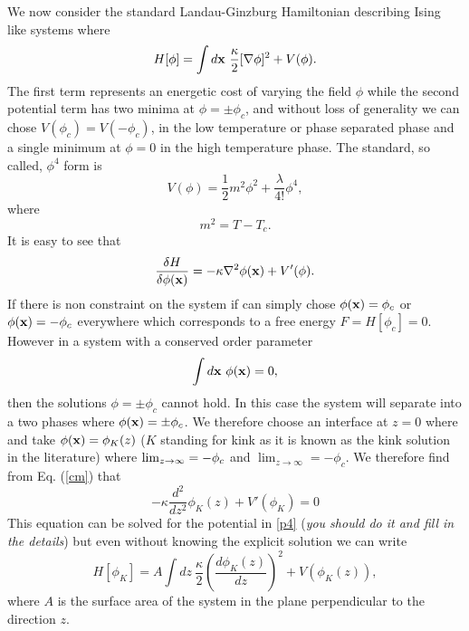 We now consider the standard Landau-Ginzburg Hamiltonian describing Ising like systems where
\begin{equation}
H[\phi] = \int d{\bf x} \ \frac{\kappa}{2}[\nabla \phi]^2 + V(\phi) .
\end{equation}
The first term represents an energetic cost of varying the field $\phi$ while the second potential term has two minima at $\phi=\pm \phi_c$, and without loss of generality we can chose  $V(\phi_c)=V(-\phi_c)$, in the low temperature or phase separated phase and a single minimum at $\phi=0$ in the high temperature phase. The standard, so called, $\phi^4$ form is
\begin{equation}
V(\phi) = \frac{1}{2} m^2 \phi^2 + \frac{\lambda}{4!} \phi^4,\label{p4}
\end{equation} 
where 
\begin{equation}
m^2 = T-T_c.
\end{equation}
It is easy to see that 
\begin{equation}
\frac{\delta H}{\delta \phi({\bf x})} = -\kappa \nabla^2 \phi({\bf x}) + V'(\phi).\label{cm}
\end{equation}
If there is non constraint on the system if can simply chose $\phi({\bf x}) =\phi_c$ or $\phi({\bf x}) =-\phi_c$ everywhere which corresponds to a  free energy $F=H[\phi_c]=0$. However in a system with a conserved order parameter
\begin{equation}
\int d{\bf x} \  \phi({\bf x})=0, 
\end{equation}
then the solutions $\phi=\pm \phi_c$ cannot hold. In this case the system will separate into a two phases where $\phi({\bf x})= \pm \phi_c$. We therefore choose an interface at $z=0$ where 
and take $\phi({\bf x}) = \phi_K(z)$ ($K$ standing for kink as it is known as the kink solution in the literature) where $\lim_{z\to\-\infty}=-\phi_c$ and  $\lim_{z\to\infty}=-\phi_c$. 
We therefore find from Eq. (\ref{cm}) that
\begin{equation}
-\kappa \frac{d^2 }{dz^2}\phi_K(z)  + V'(\phi_K) = 0 \label{kk0}
\end{equation}
This equation can be solved for the potential in \eqref{p4} ({\em you should do it and fill in the details}) but even without knowing the explicit solution we can write
\begin{equation}
H[\phi_K]=  A\int dz \ \frac{\kappa}{2}\left(\frac{d\phi_K(z)}{dz}\right)^2 + V(\phi_K(z)),\label{kk1}
\end{equation}
where $A$ is the surface area of the system in the plane perpendicular to the direction $z$. 
